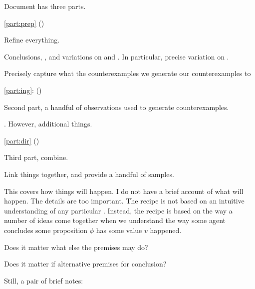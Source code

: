 \begin{note}
  Document has three parts.
  \begin{TOCEnum}
  \item
    \autoref{part:prep} ()

    Refine everything.

    Conclusions, \ros{}, and variations on \qWhy{} and \qHow{}.
    In particular, precise variation on \qWhy{}.

    Precisely capture what the counterexamples we generate our counterexamples to
  \item
    \autoref{part:ing}: ()

    Second part, a handful of observations used to generate counterexamples.

    .
    However, additional things.
  \item
    \autoref{part:dir} ()

    Third part, combine.

    Link things together, and provide a handful of samples.
  \end{TOCEnum}
\end{note}

\begin{note}
  This covers how things will happen.
  I do not have a brief account of what will happen.
  The details are too important.
  The recipe is not based on an intuitive understanding of any particular \scen{}.
  Instead, the recipe is based on the way a number of ideas come together when we understand the way some agent concludes some proposition \(\phi\) has some value \(v\) happened.
\end{note}

\begin{note}
  Does it matter what else the premises may do?

  Does it matter if alternative premises for conclusion?
\end{note}


\begin{note}
  Still, a pair of brief notes:
\end{note}

